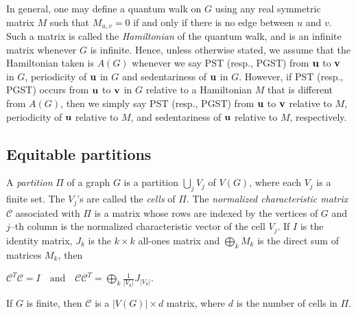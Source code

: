 \documentclass[12pt,a4paper]{article}
\def \u {{\bf u}}
\def \v {{\bf v}}
\def \o {{\bf 0}}
\begin{document}
In general, one may define a quantum walk on $G$ using any real symmetric matrix $M$ such that $M_{u,v}=0$ if and only if there is no edge between $u$ and $v$. Such a matrix is called the \textit{Hamiltonian} of the quantum walk, and is an infinite matrix whenever $G$ is infinite. Hence, unless otherwise stated, we assume that the Hamiltonian taken is $A(G)$ whenever we say PST (resp., PGST) from $\u$ to $\v$ in $G$, periodicity of $\u$ in $G$ and sedentariness of $\u$ in $G$.  However, if PST (resp., PGST) occurs from $\u$ to $\v$ in $G$ relative to a Hamiltonian $M$ that is different from $A(G)$, then we simply say PST (resp., PGST) from $\u$ to $\v$ relative to $M$, periodicity of $\u$ relative to $M$, and sedentariness of $\u$ relative to $M$, respectively.



\subsection{Equitable partitions}

A \textit{partition} $\Pi$ of a graph $G$ is a partition $\bigcup_j V_j$ of $V(G)$, where each $V_j$ is a finite set. The $V_j$'s are called the \textit{cells} of $\Pi$. The \textit{normalized characteristic matrix} $\mathcal{C}$ associated with $\Pi$ is a matrix whose rows are indexed by the vertices of $G$ and $j$--th column is the normalized characteristic vector of the cell $V_j.$ If $I$ is the identity matrix, $J_k$ is the $k\times k$ all-ones matrix and $\displaystyle\bigoplus_{k} M_k$ is the direct sum of matrices $M_k$, then
\begin{center}
$\mathcal{C}^T\mathcal{C}=I\quad \text{and}\quad \displaystyle\mathcal{C}\mathcal{C}^T=\bigoplus_{k}\frac{1}{|V_k|}J_{|V_k|}.$
\end{center}
If $G$ is finite, then $\mathcal{C}$ is a $|V(G)|\times d$ matrix, where $d$ is the number of cells in $\Pi$.
\end{document}
